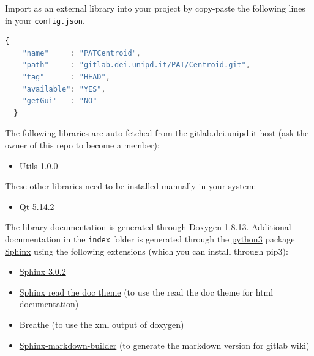 

Import as an external library into your project by copy-paste the
following lines in your \texttt{config.json}.

\begin{lstlisting}[language=javascript, gobble=2]
  {
    "name"     : "PATCentroid",
    "path"     : "gitlab.dei.unipd.it/PAT/Centroid.git",
    "tag"      : "HEAD",
    "available": "YES",
    "getGui"   : "NO"
  }
\end{lstlisting}


The following libraries are auto fetched from the gitlab.dei.unipd.it
host (ask the owner of this repo to become a member):

\begin{itemize}
  \tightlist
  \item
        \href{https://gitlab.dei.unipd.it/PAT/Utils.git}{Utils} 1.0.0
\end{itemize}

These other libraries need to be installed manually in your system:

\begin{itemize}
  \tightlist
  \item
        \href{https://www.qt.io/}{Qt} 5.14.2
\end{itemize}

The library documentation is generated through
\href{http://www.doxygen.nl/download.html}{Doxygen 1.8.13}. Additional
documentation in the \texttt{index} folder is generated through the
\href{https://www.anaconda.com/products/individual}{python3} package
\href{https://www.sphinx-doc.org/en/master/}{Sphinx} using the following
extensions (which you can install through pip3):

\begin{itemize}
  \tightlist
  \item
        \href{https://pypi.org/project/Sphinx/}{Sphinx 3.0.2}
  \item
        \href{https://sphinx-rtd-theme.readthedocs.io/en/stable/}{Sphinx read
          the doc theme} (to use the read the doc theme for html documentation)
  \item
        \href{https://pypi.org/project/breathe/}{Breathe} (to use the xml
        output of doxygen)
  \item
        \href{https://pypi.org/project/sphinx-markdown-builder/}{Sphinx-markdown-builder}
        (to generate the markdown version for gitlab wiki)
\end{itemize}

